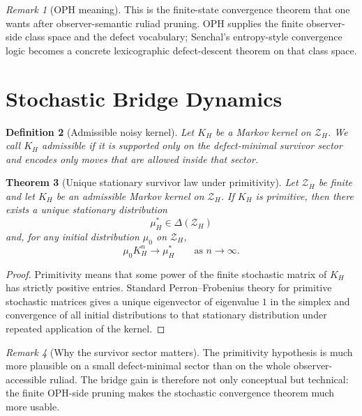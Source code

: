 \documentclass[11pt]{article}
\newtheorem{theorem}{Theorem}[section]
\newtheorem{definition}[theorem]{Definition}
\theoremstyle{remark}
\newtheorem{remark}[theorem]{Remark}
\theoremstyle{plain}
\begin{document}
\begin{remark}[OPH meaning]
This is the finite-state convergence theorem that one wants after observer-semantic ruliad pruning. OPH supplies the finite observer-side class space and the defect vocabulary; Senchal's entropy-style convergence logic becomes a concrete lexicographic defect-descent theorem on that class space.
\end{remark}

\section{Stochastic Bridge Dynamics}
\label{sec:stochastic}

\begin{definition}[Admissible noisy kernel]
Let \(K_H\) be a Markov kernel on \(\mathcal Z_H\). We call \(K_H\) admissible if it is supported only on the defect-minimal survivor sector and encodes only moves that are allowed inside that sector.
\end{definition}

\begin{theorem}[Unique stationary survivor law under primitivity]
\label{thm:stationary}
Let \(\mathcal Z_H\) be finite and let \(K_H\) be an admissible Markov kernel on \(\mathcal Z_H\). If \(K_H\) is primitive, then there exists a unique stationary distribution
\[
\mu_H^\ast\in \Delta(\mathcal Z_H)
\]
and, for any initial distribution \(\mu_0\) on \(\mathcal Z_H\),
\[
\mu_0K_H^n\to \mu_H^\ast
\qquad\text{as } n\to\infty.
\]
\end{theorem}

\begin{proof}
Primitivity means that some power of the finite stochastic matrix of \(K_H\) has strictly positive entries. Standard Perron--Frobenius theory for primitive stochastic matrices gives a unique eigenvector of eigenvalue \(1\) in the simplex and convergence of all initial distributions to that stationary distribution under repeated application of the kernel.
\end{proof}

\begin{remark}[Why the survivor sector matters]
The primitivity hypothesis is much more plausible on a small defect-minimal sector than on the whole observer-accessible ruliad. The bridge gain is therefore not only conceptual but technical: the finite OPH-side pruning makes the stochastic convergence theorem much more usable.
\end{remark}
\end{document}
